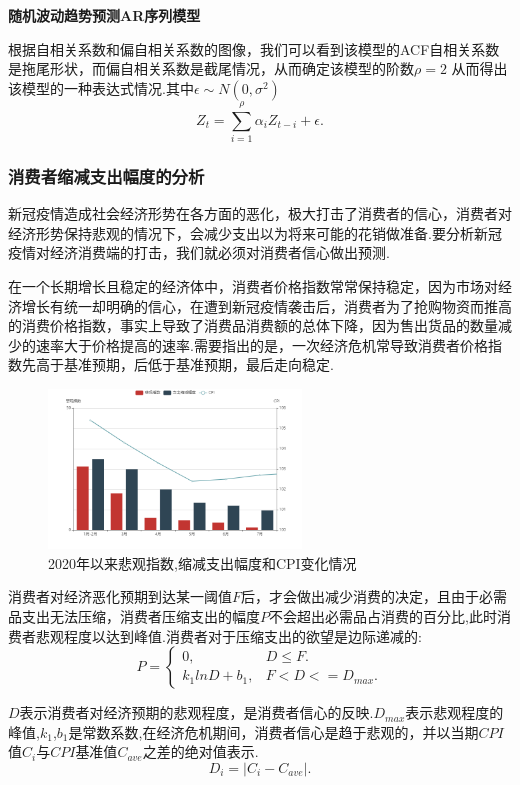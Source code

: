 \documentclass{whutmod}
\begin{document}
	\textbf{随机波动趋势预测AR序列模型}
	
	根据自相关系数和偏自相关系数的图像，我们可以看到该模型的ACF自相关系数是拖尾形状，而偏自相关系数是截尾情况，从而确定该模型的阶数$\rho=2$
	从而得出该模型的一种表达式情况.其中$\epsilon \sim N(0,\sigma^2)$
	\begin{equation}
	Z_t=\sum_{i=1}^\rho \alpha_i Z_{t-i}+\epsilon.
	\end{equation}
	\subsubsection{消费者缩减支出幅度的分析}
	新冠疫情造成社会经济形势在各方面的恶化，极大打击了消费者的信心，消费者对经济形势保持悲观的情况下，会减少支出以为将来可能的花销做准备.要分析新冠疫情对经济消费端的打击，我们就必须对消费者信心做出预测.
	
	在一个长期增长且稳定的经济体中，消费者价格指数常常保持稳定，因为市场对经济增长有统一却明确的信心，在遭到新冠疫情袭击后，消费者为了抢购物资而推高的消费价格指数，事实上导致了消费品消费额的总体下降，因为售出货品的数量减少的速率大于价格提高的速率.需要指出的是，一次经济危机常导致消费者价格指数先高于基准预期，后低于基准预期，最后走向稳定.
	\begin{figure}[!htbp]
		\centering
		\includegraphics[width=0.6\textwidth]{beiguan.png}
		\caption{2020年以来悲观指数,缩减支出幅度和CPI变化情况}
	\end{figure}
	消费者对经济恶化预期到达某一阈值$F$后，才会做出减少消费的决定，且由于必需品支出无法压缩，消费者压缩支出的幅度$P$不会超出必需品占消费的百分比,此时消费者悲观程度以达到峰值.消费者对于压缩支出的欲望是边际递减的:
	\begin{equation}
	P=\begin{cases}
	0, & D \leq F.\\
	k_{1}lnD+b_{1}, & F<D<=D_{max}.
	\end{cases}
	\end{equation}
	
	$D$表示消费者对经济预期的悲观程度，是消费者信心的反映.$D_{max}$表示悲观程度的峰值,$k_{1}$,$b_{1}$是常数系数,在经济危机期间，消费者信心是趋于悲观的，并以当期$CPI$值$C_{i}$与$CPI$基准值$C_{ave}$之差的绝对值表示.
	\begin{equation}
	D_{i}=|C_{i}-C_{ave}|.
	\end{equation}
	
\end{document}
